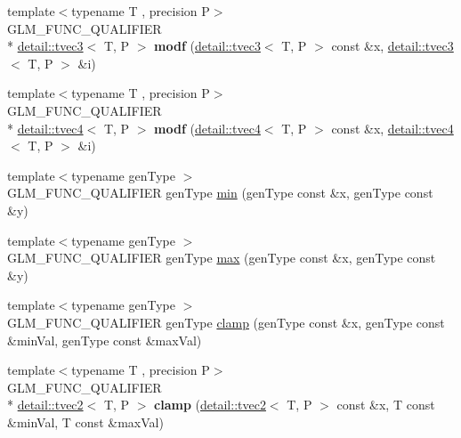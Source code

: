 \begin{DoxyCompactItemize}
\item 
\hypertarget{namespaceglm_a9ffab41035ab5fc8709bb582a3d8fae5}{{\footnotesize template$<$typename T , precision P$>$ }\\G\-L\-M\-\_\-\-F\-U\-N\-C\-\_\-\-Q\-U\-A\-L\-I\-F\-I\-E\-R \\*
\hyperlink{structglm_1_1detail_1_1tvec3}{detail\-::tvec3}$<$ T, P $>$ {\bfseries modf} (\hyperlink{structglm_1_1detail_1_1tvec3}{detail\-::tvec3}$<$ T, P $>$ const \&x, \hyperlink{structglm_1_1detail_1_1tvec3}{detail\-::tvec3}$<$ T, P $>$ \&i)}\label{namespaceglm_a9ffab41035ab5fc8709bb582a3d8fae5}

\item 
\hypertarget{namespaceglm_aeeecd3b255dc5fc394738bd25e0cea49}{{\footnotesize template$<$typename T , precision P$>$ }\\G\-L\-M\-\_\-\-F\-U\-N\-C\-\_\-\-Q\-U\-A\-L\-I\-F\-I\-E\-R \\*
\hyperlink{structglm_1_1detail_1_1tvec4}{detail\-::tvec4}$<$ T, P $>$ {\bfseries modf} (\hyperlink{structglm_1_1detail_1_1tvec4}{detail\-::tvec4}$<$ T, P $>$ const \&x, \hyperlink{structglm_1_1detail_1_1tvec4}{detail\-::tvec4}$<$ T, P $>$ \&i)}\label{namespaceglm_aeeecd3b255dc5fc394738bd25e0cea49}

\item 
{\footnotesize template$<$typename gen\-Type $>$ }\\G\-L\-M\-\_\-\-F\-U\-N\-C\-\_\-\-Q\-U\-A\-L\-I\-F\-I\-E\-R gen\-Type \hyperlink{group__core__func__common_ga3dc90dbd66c9ca1dd5625c93d9c50f02}{min} (gen\-Type const \&x, gen\-Type const \&y)
\item 
{\footnotesize template$<$typename gen\-Type $>$ }\\G\-L\-M\-\_\-\-F\-U\-N\-C\-\_\-\-Q\-U\-A\-L\-I\-F\-I\-E\-R gen\-Type \hyperlink{group__core__func__common_gaa228561a9da55898f8f72ad2403fafac}{max} (gen\-Type const \&x, gen\-Type const \&y)
\item 
{\footnotesize template$<$typename gen\-Type $>$ }\\G\-L\-M\-\_\-\-F\-U\-N\-C\-\_\-\-Q\-U\-A\-L\-I\-F\-I\-E\-R gen\-Type \hyperlink{group__core__func__common_ga72e9e213c84f06a329a2a838b51200f4}{clamp} (gen\-Type const \&x, gen\-Type const \&min\-Val, gen\-Type const \&max\-Val)
\item 
\hypertarget{namespaceglm_acfba9759719471fb9495f97046389339}{{\footnotesize template$<$typename T , precision P$>$ }\\G\-L\-M\-\_\-\-F\-U\-N\-C\-\_\-\-Q\-U\-A\-L\-I\-F\-I\-E\-R \\*
\hyperlink{structglm_1_1detail_1_1tvec2}{detail\-::tvec2}$<$ T, P $>$ {\bfseries clamp} (\hyperlink{structglm_1_1detail_1_1tvec2}{detail\-::tvec2}$<$ T, P $>$ const \&x, T const \&min\-Val, T const \&max\-Val)}\label{namespaceglm_acfba9759719471fb9495f97046389339}


\end{DoxyCompactItemize}
